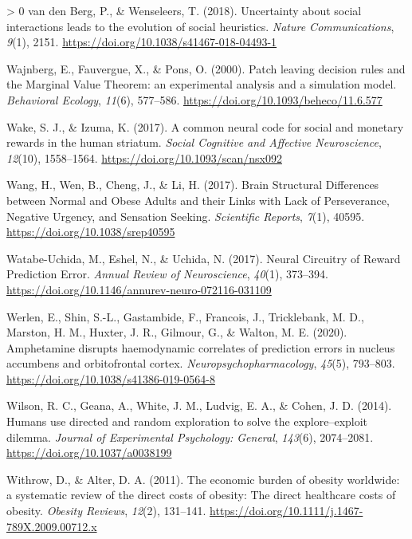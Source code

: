 \documentclass[
]{/home/nicoluarte/Downloads/templates/PNAS-template-main.tex}
\newlength{\cslhangindent}
\newenvironment{CSLReferences}[3] %
 {%
  \setlength{\parindent}{0pt}
  \ifodd #1 \everypar{\setlength{\hangindent}{\cslhangindent}}\ignorespaces\fi
  \ifnum #2 > 0
  \setlength{\parskip}{#2\baselineskip}
  \fi
 }%
 {}
\begin{document}
\begin{CSLReferences}{1}{0}
\leavevmode\hypertarget{ref-S53QRP94}{}%
van den Berg, P., \& Wenseleers, T. (2018). Uncertainty about social
interactions leads to the evolution of social heuristics. \emph{Nature
Communications}, \emph{9}(1), 2151.
\url{https://doi.org/10.1038/s41467-018-04493-1}

\leavevmode\hypertarget{ref-IJSUH426}{}%
Wajnberg, E., Fauvergue, X., \& Pons, O. (2000). Patch leaving decision
rules and the Marginal Value Theorem: an experimental analysis and a
simulation model. \emph{Behavioral Ecology}, \emph{11}(6), 577--586.
\url{https://doi.org/10.1093/beheco/11.6.577}

\leavevmode\hypertarget{ref-UVXRU55G}{}%
Wake, S. J., \& Izuma, K. (2017). A common neural code for social and
monetary rewards in the human striatum. \emph{Social Cognitive and
Affective Neuroscience}, \emph{12}(10), 1558--1564.
\url{https://doi.org/10.1093/scan/nsx092}

\leavevmode\hypertarget{ref-THS94923}{}%
Wang, H., Wen, B., Cheng, J., \& Li, H. (2017). Brain Structural
Differences between Normal and Obese Adults and their Links with Lack of
Perseverance, Negative Urgency, and Sensation Seeking. \emph{Scientific
Reports}, \emph{7}(1), 40595. \url{https://doi.org/10.1038/srep40595}

\leavevmode\hypertarget{ref-NLDHLRVN}{}%
Watabe-Uchida, M., Eshel, N., \& Uchida, N. (2017). Neural Circuitry of
Reward Prediction Error. \emph{Annual Review of Neuroscience},
\emph{40}(1), 373--394.
\url{https://doi.org/10.1146/annurev-neuro-072116-031109}

\leavevmode\hypertarget{ref-7SLC53RQ}{}%
Werlen, E., Shin, S.-L., Gastambide, F., Francois, J., Tricklebank, M.
D., Marston, H. M., Huxter, J. R., Gilmour, G., \& Walton, M. E. (2020).
Amphetamine disrupts haemodynamic correlates of prediction errors in
nucleus accumbens and orbitofrontal cortex.
\emph{Neuropsychopharmacology}, \emph{45}(5), 793--803.
\url{https://doi.org/10.1038/s41386-019-0564-8}

\leavevmode\hypertarget{ref-VRHNLHDG}{}%
Wilson, R. C., Geana, A., White, J. M., Ludvig, E. A., \& Cohen, J. D.
(2014). Humans use directed and random exploration to solve the
explore--exploit dilemma. \emph{Journal of Experimental Psychology:
General}, \emph{143}(6), 2074--2081.
\url{https://doi.org/10.1037/a0038199}

\leavevmode\hypertarget{ref-NL7KNKU2}{}%
Withrow, D., \& Alter, D. A. (2011). The economic burden of obesity
worldwide: a systematic review of the direct costs of obesity: The
direct healthcare costs of obesity. \emph{Obesity Reviews},
\emph{12}(2), 131--141.
\url{https://doi.org/10.1111/j.1467-789X.2009.00712.x}


\end{CSLReferences}
\end{document}
